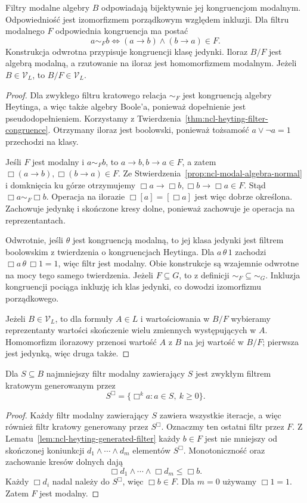 \begin{twierdzenie}
\label{thm:ncl-modal-filter-congruence}
Filtry modalne algebry $B$ odpowiadają
bijektywnie jej kongruencjom modalnym.
Odpowiedniość jest izomorfizmem porządkowym
względem inkluzji.
Dla filtru modalnego $F$ odpowiednia kongruencja
ma postać
\[
 a\sim_F b
 \iff (a\to b)\wedge(b\to a)\in F.
\]
Konstrukcja odwrotna przypisuje kongruencji
klasę jedynki. Iloraz $B/F$ jest algebrą modalną,
a rzutowanie na iloraz jest homomorfizmem modalnym.
Jeżeli $B\in\mathcal V_L$, to $B/F\in\mathcal V_L$.
\end{twierdzenie}
\begin{proof}
Dla zwykłego filtru kratowego relacja $\sim_F$
jest kongruencją algebry Heytinga, a więc także
algebry Boole'a, ponieważ dopełnienie jest
pseudodopełnieniem. Korzystamy z
Twierdzenia~\ref{thm:ncl-heyting-filter-congruence}.
Otrzymany iloraz jest boolowski, ponieważ
tożsamość $a\vee\neg a=1$ przechodzi na klasy.

Jeśli $F$ jest modalny i $a\sim_F b$, to
$a\to b,b\to a\in F$, a zatem
$\Box(a\to b),\Box(b\to a)\in F$.
Ze Stwierdzenia~\ref{prop:ncl-modal-algebra-normal}
i domknięcia ku górze otrzymujemy
$\Box a\to\Box b,\Box b\to\Box a\in F$.
Stąd $\Box a\sim_F\Box b$.
Operacja na ilorazie
$\Box[a]=[\Box a]$ jest więc dobrze określona.
Zachowuje jedynkę i skończone kresy dolne,
ponieważ zachowuje je operacja na reprezentantach.

Odwrotnie, jeśli $\theta$ jest kongruencją modalną,
to jej klasa jedynki jest filtrem boolowskim
z twierdzenia o kongruencjach Heytinga.
Dla $a\,\theta\,1$ zachodzi
$\Box a\,\theta\,\Box1=1$, więc filtr jest modalny.
Obie konstrukcje są wzajemnie odwrotne na mocy
tego samego twierdzenia.
Jeżeli $F\subseteq G$, to z definicji
$\sim_F\subseteq\sim_G$. Inkluzja kongruencji
pociąga inkluzję ich klas jedynki,
co dowodzi izomorfizmu porządkowego.

Jeżeli $B\in\mathcal V_L$, to dla formuły $A\in L$
i wartościowania w $B/F$ wybieramy reprezentanty
wartości skończenie wielu zmiennych występujących
w $A$. Homomorfizm ilorazowy przenosi
wartość $A$ z $B$ na jej wartość w $B/F$;
pierwsza jest jedynką, więc druga także.
\end{proof}

\begin{stwierdzenie}
\label{prop:ncl-modal-generated-filter}
Dla $S\subseteq B$ najmniejszy filtr modalny
zawierający $S$ jest zwykłym filtrem kratowym
generowanym przez
\[
 S^\Box=\{\Box^k a:a\in S,\ k\geq0\}.
\]
\end{stwierdzenie}
\begin{proof}
Każdy filtr modalny zawierający $S$ zawiera
wszystkie iteracje, a więc również filtr
kratowy generowany przez $S^\Box$.
Oznaczmy ten ostatni filtr przez $F$.
Z Lematu~\ref{lem:ncl-heyting-generated-filter}
każdy $b\in F$ jest nie mniejszy od
skończonej koniunkcji $d_1\wedge\cdots\wedge d_m$
elementów $S^\Box$.
Monotoniczność oraz zachowanie kresów dolnych
dają
\[
 \Box d_1\wedge\cdots\wedge\Box d_m\leq\Box b.
\]
Każdy $\Box d_i$ nadal należy do $S^\Box$,
więc $\Box b\in F$. Dla $m=0$ używamy
$\Box1=1$. Zatem $F$ jest modalny.
\end{proof}

